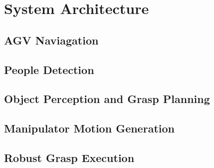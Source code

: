\section{System Architecture}
\label{sec:arch}

\subsection{AGV Naviagation}
\label{subsec:navigation}

\subsection{People Detection}
\label{subsec:people_det}

\subsection{Object Perception and Grasp Planning}
\label{subsec:perception_planning}

\subsection{Manipulator Motion Generation}
\label{subsec:manip_motion}

\subsection{Robust Grasp Execution}
\label{subsec:grasp_execution}


